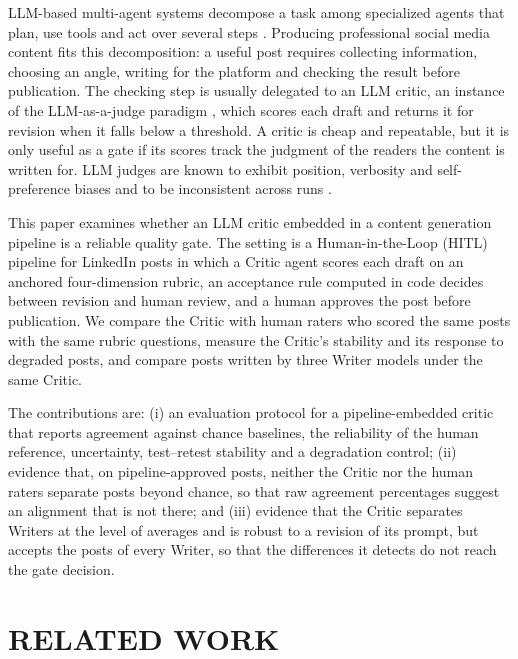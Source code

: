 \documentclass[a4paper,twoside]{article}
\begin{document}
LLM-based multi-agent systems decompose a task among specialized agents that plan, use tools and act over several steps \cite{yao2023react,hong2024metagpt,wu2024autogen}. Producing professional social media content fits this decomposition: a useful post requires collecting information, choosing an angle, writing for the platform and checking the result before publication. The checking step is usually delegated to an LLM critic, an instance of the LLM-as-a-judge paradigm \cite{zheng2023judging,gu2026survey}, which scores each draft and returns it for revision when it falls below a threshold. A critic is cheap and repeatable, but it is only useful as a gate if its scores track the judgment of the readers the content is written for. LLM judges are known to exhibit position, verbosity and self-preference biases \cite{zheng2023judging,panickssery2024llm} and to be inconsistent across runs \cite{stureborg2024inconsistent}.

This paper examines whether an LLM critic embedded in a content generation pipeline is a reliable quality gate. The setting is a Human-in-the-Loop (HITL) pipeline for LinkedIn posts in which a Critic agent scores each draft on an anchored four-dimension rubric, an acceptance rule computed in code decides between revision and human review, and a human approves the post before publication. We compare the Critic with human raters who scored the same posts with the same rubric questions, measure the Critic's stability and its response to degraded posts, and compare posts written by three Writer models under the same Critic.

The contributions are: (i) an evaluation protocol for a pipeline-embedded critic that reports agreement against chance baselines, the reliability of the human reference, uncertainty, test--retest stability and a degradation control; (ii) evidence that, on pipeline-approved posts, neither the Critic nor the human raters separate posts beyond chance, so that raw agreement percentages suggest an alignment that is not there; and (iii) evidence that the Critic separates Writers at the level of averages and is robust to a revision of its prompt, but accepts the posts of every Writer, so that the differences it detects do not reach the gate decision.

\section{\uppercase{Related Work}}
\label{sec:related}
\end{document}
